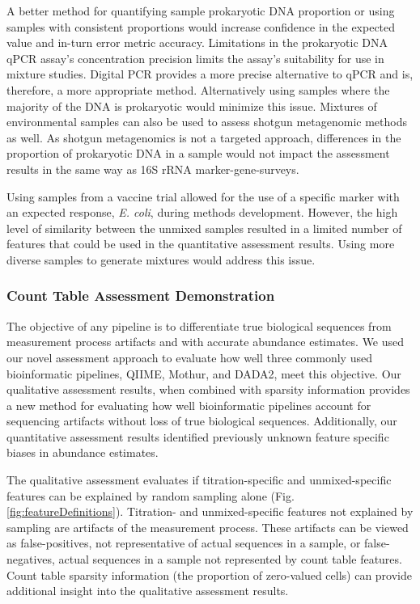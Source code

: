 \documentclass[linenumbers]{bmcart}
\begin{document}
A better method for quantifying sample prokaryotic DNA proportion or
using samples with consistent proportions would increase confidence in
the expected value and in-turn error metric accuracy. Limitations in the
prokaryotic DNA qPCR assay's concentration precision limits the
assay's suitability for use in mixture studies. Digital PCR provides a
more precise alternative to qPCR and is, therefore, a more appropriate
method. Alternatively using samples where the majority of the DNA is
prokaryotic would minimize this issue. Mixtures of environmental samples
can also be used to assess shotgun metagenomic methods as well. As
shotgun metagenomics is not a targeted approach, differences in the
proportion of prokaryotic DNA in a sample would not impact the
assessment results in the same way as 16S rRNA marker-gene-surveys.

Using samples from a vaccine trial allowed for the use of a specific
marker with an expected response, \emph{E. coli}, during methods
development. However, the high level of similarity between the unmixed
samples resulted in a limited number of features that could be used in
the quantitative assessment results. Using more diverse samples to
generate mixtures would address this issue.

\subsubsection*{Count Table Assessment Demonstration}
The objective of any pipeline is to differentiate true biological sequences from measurement process artifacts and with accurate abundance estimates.
We used our novel assessment approach to evaluate how well three commonly used bioinformatic pipelines, QIIME, Mothur, and DADA2, meet this objective.
Our qualitative assessment results, when combined with sparsity information provides a new method for evaluating how well bioinformatic pipelines account for sequencing artifacts without loss of true biological sequences.
Additionally, our quantitative assessment results identified previously unknown feature specific biases in abundance estimates.

The qualitative assessment evaluates if titration-specific and unmixed-specific features can be explained by random sampling alone (Fig. \ref{fig:featureDefinitions}).
Titration- and unmixed-specific features not explained by sampling are artifacts of the measurement process.
These artifacts can be viewed as false-positives, not representative of actual sequences in a sample, or false-negatives, actual sequences in a sample not represented by count table features.
Count table sparsity information (the proportion of zero-valued cells) can provide additional insight into the qualitative assessment results.
\end{document}
